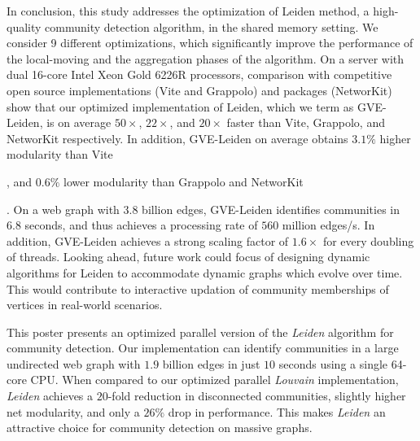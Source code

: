 In conclusion, this study addresses the optimization of Leiden method, a high-quality community detection algorithm, in the shared memory setting. We consider 9 different optimizations, which significantly improve the performance of the local-moving and the aggregation phases of the algorithm. On a server with dual 16-core Intel Xeon Gold 6226R processors, comparison with competitive open source implementations (Vite and Grappolo) and packages (NetworKit) show that our optimized implementation of Leiden, which we term as GVE-Leiden, is on average $50\times$, $22\times$, and $20\times$ faster than Vite, Grappolo, and NetworKit respectively. In addition, GVE-Leiden on average obtains $3.1\%$ higher modularity than Vite, and $0.6\%$ lower modularity than Grappolo and NetworKit. On a web graph with $3.8$ billion edges, GVE-Leiden identifies communities in $6.8$ seconds, and thus achieves a processing rate of $560$ million edges/s. In addition, GVE-Leiden achieves a strong scaling factor of $1.6\times$ for every doubling of threads. Looking ahead, future work could focus of designing dynamic algorithms for Leiden to accommodate dynamic graphs which evolve over time. This would contribute to interactive updation of community memberships of vertices in real-world scenarios.


This poster presents an optimized parallel version of the \textit{Leiden} algorithm for community detection. Our implementation can identify communities in a large undirected web graph with $1.9$ billion edges in just $10$ seconds using a single 64-core CPU. When compared to our optimized parallel \textit{Louvain} implementation, \textit{Leiden} achieves a $20$-fold reduction in disconnected communities, slightly higher net modularity, and only a $26\%$ drop in performance. This makes \textit{Leiden} an attractive choice for community detection on massive graphs.
